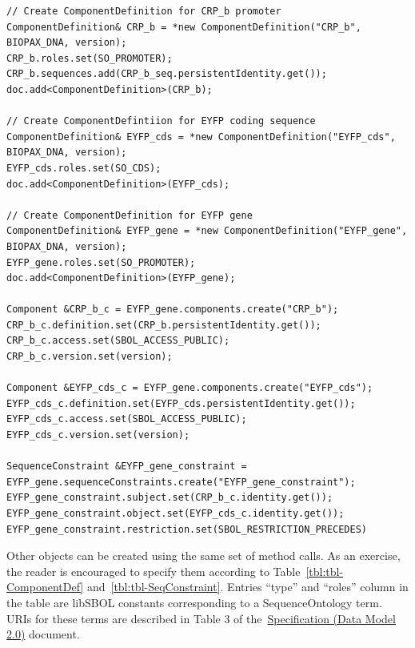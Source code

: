 \vspace{\abovedisplayskip}
\begin{minipage}{0.95\textwidth}
\begin{lstlisting}
// Create ComponentDefinition for CRP_b promoter
ComponentDefinition& CRP_b = *new ComponentDefinition("CRP_b", BIOPAX_DNA, version);
CRP_b.roles.set(SO_PROMOTER);
CRP_b.sequences.add(CRP_b_seq.persistentIdentity.get());
doc.add<ComponentDefinition>(CRP_b);

// Create ComponentDefintiion for EYFP coding sequence
ComponentDefinition& EYFP_cds = *new ComponentDefinition("EYFP_cds", BIOPAX_DNA, version);
EYFP_cds.roles.set(SO_CDS);
doc.add<ComponentDefinition>(EYFP_cds);

// Create ComponentDefinition for EYFP gene
ComponentDefinition& EYFP_gene = *new ComponentDefinition("EYFP_gene", BIOPAX_DNA, version);
EYFP_gene.roles.set(SO_PROMOTER);
doc.add<ComponentDefinition>(EYFP_gene);

Component &CRP_b_c = EYFP_gene.components.create("CRP_b");
CRP_b_c.definition.set(CRP_b.persistentIdentity.get());
CRP_b_c.access.set(SBOL_ACCESS_PUBLIC);
CRP_b_c.version.set(version);

Component &EYFP_cds_c = EYFP_gene.components.create("EYFP_cds");
EYFP_cds_c.definition.set(EYFP_cds.persistentIdentity.get());
EYFP_cds_c.access.set(SBOL_ACCESS_PUBLIC);
EYFP_cds_c.version.set(version);

SequenceConstraint &EYFP_gene_constraint = EYFP_gene.sequenceConstraints.create("EYFP_gene_constraint");
EYFP_gene_constraint.subject.set(CRP_b_c.identity.get());
EYFP_gene_constraint.object.set(EYFP_cds_c.identity.get());
EYFP_gene_constraint.restriction.set(SBOL_RESTRICTION_PRECEDES)
\end{lstlisting}
\end{minipage}

Other  objects can be created using the same set of method calls. As an exercise, the reader is encouraged to specify them according to Table~\ref{tbl:tbl-ComponentDef} and~\ref{tbl:tbl-SeqConstraint}. Entries ``type'' and ``roles'' column in the table are libSBOL constants corresponding to a SequenceOntology term. URIs for these terms are described in Table 3 of the~\href{http://sbolstandard.org/downloads/specification-data-model-2-0/}{Specification  (Data Model 2.0)} document.

